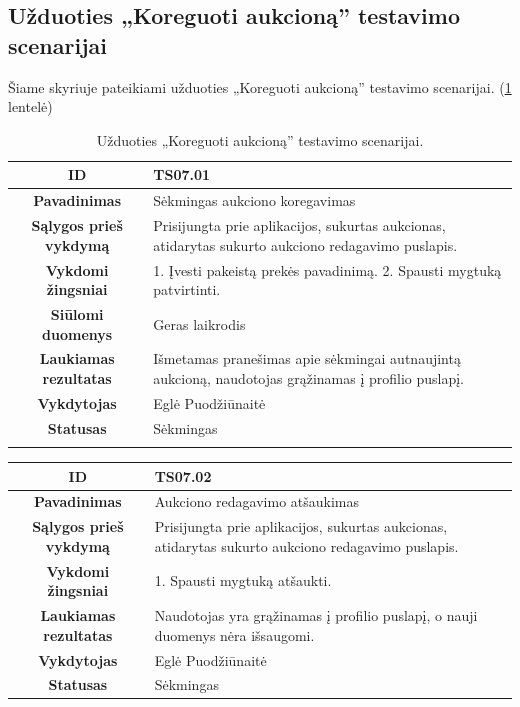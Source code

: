 \documentclass{VUMIFPSkursinis}
\begin{document}
		\subsection{Užduoties „Koreguoti aukcioną” testavimo scenarijai}
Šiame skyriuje pateikiami užduoties „Koreguoti aukcioną” testavimo scenarijai. (\ref{koregavimas} lentelė)
\begin{table}[H]
	\caption{Užduoties „Koreguoti aukcioną” testavimo scenarijai.}
	\begin{tabular}{|p{6cm}|p{11cm}|}
		\hline
		\multicolumn{1}{|c|}{{\bfseries ID}}&
		{TS07.01}\\
		\hline
		\multicolumn{1}{|c|}{{\bfseries Pavadinimas}}&
		{Sėkmingas aukciono koregavimas}\\
		\hline
		\multicolumn{1}{|c|}{{\bfseries Sąlygos prieš vykdymą}}&
		{Prisijungta prie aplikacijos, sukurtas aukcionas, atidarytas sukurto aukciono redagavimo puslapis.}\\
		\hline
		\multicolumn{1}{|c|}{{\bfseries Vykdomi žingsniai}}&
		{1. Įvesti pakeistą prekės pavadinimą.
			2. Spausti mygtuką patvirtinti.}\\
		\hline
		\multicolumn{1}{|c|}{{\bfseries Siūlomi duomenys}}&
		{Geras laikrodis}\\
		\hline
		\multicolumn{1}{|c|}{{\bfseries Laukiamas rezultatas}}&
		{Išmetamas pranešimas apie sėkmingai autnaujintą aukcioną, naudotojas grąžinamas į profilio puslapį.}\\
		\hline
		\multicolumn{1}{|c|}{{\bfseries Vykdytojas}}&
		{Eglė Puodžiūnaitė}\\
		\hline
		\multicolumn{1}{|c|}{{\bfseries Statusas}}&
		{Sėkmingas}\\
		\hline
		\rowcolor{lightgray}
		\multicolumn{2}{|c|}{}\\
		\hline				
		\end{tabular}
	\label{koregavimas}
	\end{table}	
	\begin{table}[H]
		\begin{tabular}{|p{6cm}|p{11cm}|}
		\hline
		\multicolumn{1}{|c|}{{\bfseries ID}}&
		{TS07.02}\\
		\hline
		\multicolumn{1}{|c|}{{\bfseries Pavadinimas}}&
		{Aukciono redagavimo atšaukimas}\\
		\hline
		\multicolumn{1}{|c|}{{\bfseries Sąlygos prieš vykdymą}}&
		{Prisijungta prie aplikacijos, sukurtas aukcionas, atidarytas sukurto aukciono redagavimo puslapis.}\\
		\hline
		\multicolumn{1}{|c|}{{\bfseries Vykdomi žingsniai}}&
		{1. Spausti mygtuką atšaukti.}\\
		\hline
		\multicolumn{1}{|c|}{{\bfseries Laukiamas rezultatas}}&
		{Naudotojas yra grąžinamas į profilio puslapį, o nauji duomenys nėra išsaugomi.}\\
		\hline
		\multicolumn{1}{|c|}{{\bfseries Vykdytojas}}&
		{Eglė Puodžiūnaitė}\\
		\hline
		\multicolumn{1}{|c|}{{\bfseries Statusas}}&
		{Sėkmingas}\\
		\hline		
	\end{tabular}
\end{table}	
	
\end{document}
